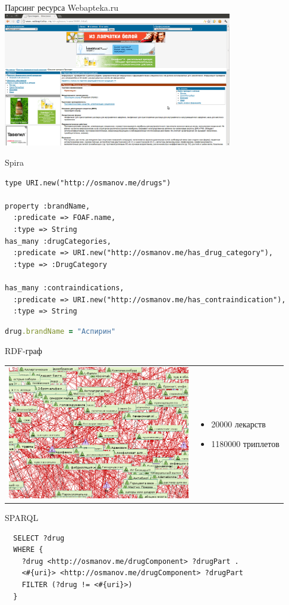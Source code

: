 \documentclass{beamer}
\begin{document}
\begin{frame}[t]{Парсинг ресурса Webapteka.ru}
\includegraphics[width=100mm]{webapteka.png}
\end{frame}
\begin{frame}[fragile]{Spira}
\begin{lstlisting}
type URI.new("http://osmanov.me/drugs")

property :brandName,  
  :predicate => FOAF.name, 
  :type => String
has_many :drugCategories, 
  :predicate => URI.new("http://osmanov.me/has_drug_category"), 
  :type => :DrugCategory

has_many :contraindications, 
  :predicate => URI.new("http://osmanov.me/has_contraindication"), 
  :type => String
\end{lstlisting}
\begin{lstlisting}[language=Ruby]
drug.brandName = "Аспирин"
\end{lstlisting}
\end{frame}
\begin{frame}[t]{RDF-граф}

\begin{tabular}{l l}
\begin{minipage}{0.75\textwidth}
\includegraphics[width=80mm]{graph.png}
\end{minipage}
&
\begin{minipage}{0.25\textwidth}
\begin{itemize}
\item 20000 лекарств
\item 1180000 триплетов
\end{itemize}
\end{minipage}
\end{tabular}
\end{frame}
\begin{frame}[fragile]{SPARQL}
\begin{lstlisting}
  SELECT ?drug 
  WHERE {
    ?drug <http://osmanov.me/drugComponent> ?drugPart .
    <#{uri}> <http://osmanov.me/drugComponent> ?drugPart
    FILTER (?drug != <#{uri}>)
  }
\end{lstlisting}

\end{frame}
\end{document}
